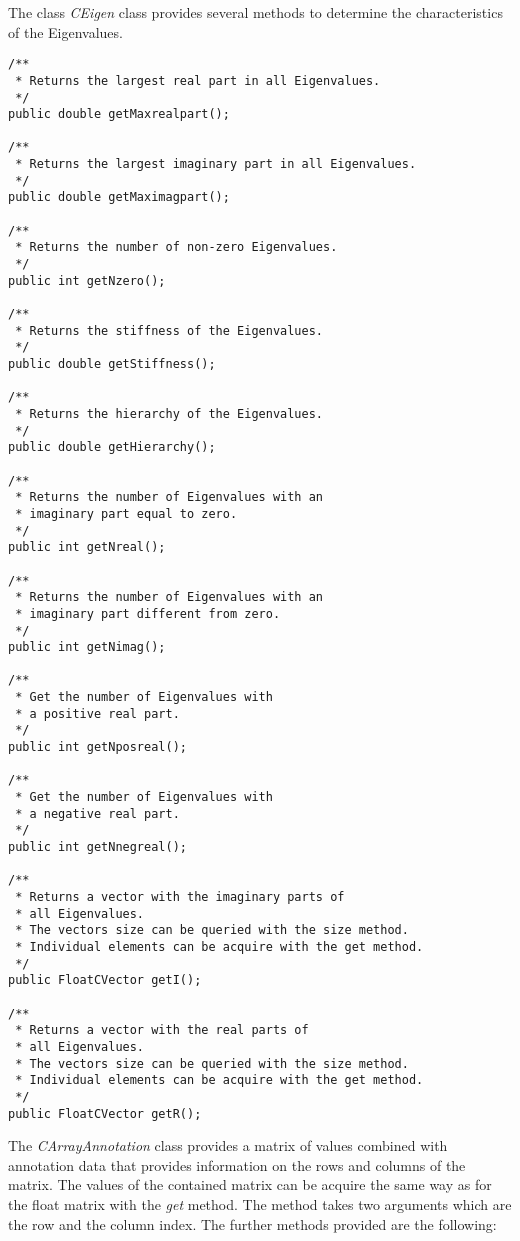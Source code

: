 \documentclass[a4,10pt]{article}
\begin{document}
The class \textit{CEigen} class provides several methods to determine the characteristics of the Eigenvalues.

\begin{lstlisting}
/**
 * Returns the largest real part in all Eigenvalues.
 */
public double getMaxrealpart();

/**
 * Returns the largest imaginary part in all Eigenvalues.
 */
public double getMaximagpart();

/**
 * Returns the number of non-zero Eigenvalues.
 */
public int getNzero();

/**
 * Returns the stiffness of the Eigenvalues.
 */
public double getStiffness();

/**
 * Returns the hierarchy of the Eigenvalues.
 */
public double getHierarchy();

/**
 * Returns the number of Eigenvalues with an
 * imaginary part equal to zero.
 */
public int getNreal();

/**
 * Returns the number of Eigenvalues with an
 * imaginary part different from zero.
 */
public int getNimag();

/**
 * Get the number of Eigenvalues with
 * a positive real part.
 */
public int getNposreal();

/**
 * Get the number of Eigenvalues with
 * a negative real part.
 */
public int getNnegreal();

/**
 * Returns a vector with the imaginary parts of
 * all Eigenvalues.
 * The vectors size can be queried with the size method.
 * Individual elements can be acquire with the get method.
 */
public FloatCVector getI();

/**
 * Returns a vector with the real parts of
 * all Eigenvalues.
 * The vectors size can be queried with the size method.
 * Individual elements can be acquire with the get method.
 */
public FloatCVector getR();
\end{lstlisting}

The \textit{CArrayAnnotation} class provides a matrix of values combined with annotation data that provides information on the rows and columns of the matrix.
The values of the contained matrix can be acquire the same way as for the float matrix with the \textit{get} method. The method takes two arguments which are the row and the column index.
The further methods provided are the following:
\end{document}
